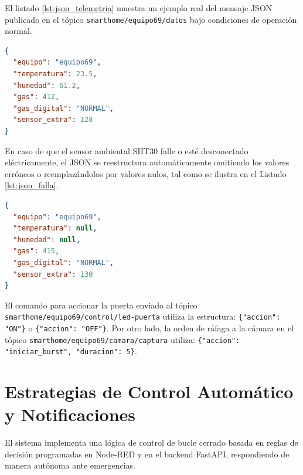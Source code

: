 \documentclass[12pt,letterpaper]{article}
\begin{document}
El listado \ref{lst:json_telemetria} muestra un ejemplo real del mensaje JSON publicado en el tópico \texttt{smarthome/equipo69/datos} bajo condiciones de operación normal.

\begin{lstlisting}[language=json, label=lst:json_telemetria, caption={Ejemplo de payload JSON publicado por el nodo de sensores.}]
{
  "equipo": "equipo69",
  "temperatura": 23.5,
  "humedad": 61.2,
  "gas": 412,
  "gas_digital": "NORMAL",
  "sensor_extra": 128
}
\end{lstlisting}

En caso de que el sensor ambiental SHT30 falle o esté desconectado eléctricamente, el JSON se reestructura automáticamente omitiendo los valores erróneos o reemplazándolos por valores nulos, tal como se ilustra en el Listado \ref{lst:json_falla}.

\begin{lstlisting}[language=json, label=lst:json_falla, caption={Ejemplo de payload JSON bajo falla del sensor SHT30.}]
{
  "equipo": "equipo69",
  "temperatura": null,
  "humedad": null,
  "gas": 415,
  "gas_digital": "NORMAL",
  "sensor_extra": 130
}
\end{lstlisting}

El comando para accionar la puerta enviado al tópico \texttt{smarthome/equipo69/control/led-puerta} utiliza la estructura: \texttt{\{"accion": "ON"\}} o \texttt{\{"accion": "OFF"\}}. Por otro lado, la orden de ráfaga a la cámara en el tópico \texttt{smarthome/equipo69/camara/captura} utiliza: \texttt{\{"accion": "iniciar\_burst", "duracion": 5\}}.

\section{Estrategias de Control Automático y Notificaciones}
El sistema implementa una lógica de control de bucle cerrado basada en reglas de decisión programadas en Node-RED y en el backend FastAPI, respondiendo de manera autónoma ante emergencias.
\end{document}
